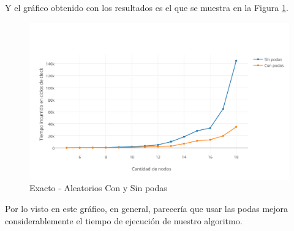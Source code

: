 Y el gráfico obtenido con los resultados es el que se muestra en la Figura \ref{fig:1F}.

\begin{figure}[htb]
	\begin{center}
    		\includegraphics[scale=0.8]{imagenes/exacto-aleatorio-conysin.png}
	\end{center}
	\caption{Exacto - Aleatorios Con y Sin podas\label{fig:1F}}
\end{figure}

Por lo visto en este gráfico, en general, parecería que usar las podas mejora considerablemente el tiempo de ejecución de nuestro algoritmo.
